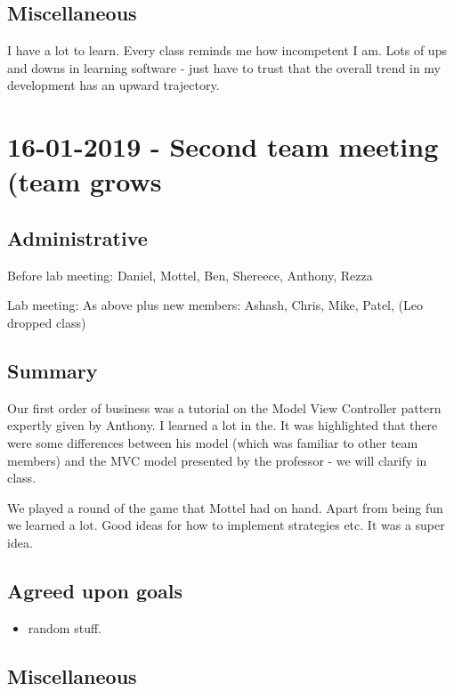 \documentclass[12pt]{article}
\begin{document}
	\subsection{Miscellaneous}
	I have a lot to learn. Every class reminds me how incompetent I am. Lots of ups and downs in learning software - just have to trust that the overall trend in my development has an upward trajectory.
	
	\pagebreak
	
	\section{16-01-2019 - Second team meeting (team grows}
	
	\subsection{Administrative}
	Before lab meeting: Daniel, Mottel, Ben, Shereece, Anthony, Rezza
	
	Lab meeting: As above plus new members: Ashash, Chris, Mike, Patel, (Leo dropped class)
	
	\subsection{Summary}
	Our first order of business was a tutorial on the Model View Controller pattern expertly given by Anthony. I learned a lot in the. It was highlighted that there were some differences between his model (which was familiar to other team members) and the MVC model presented by the professor - we will clarify in class.
	
	We played a round of the game that Mottel had on hand. Apart from being fun we learned a lot. Good ideas for how to implement strategies etc. It was a super idea.
	
	
	\subsection{Agreed upon goals}
	\begin{itemize}
		\item random stuff.
	\end{itemize}
	
	\subsection{Miscellaneous}
	
	\pagebreak
	
\end{document}
